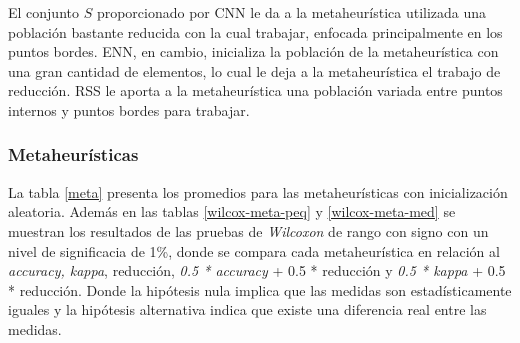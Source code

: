 El conjunto $S$ proporcionado por CNN le da a la metaheurística utilizada una población bastante reducida con la cual trabajar, enfocada principalmente en los puntos bordes. ENN, en cambio, inicializa la población de la metaheurística con una gran cantidad de elementos, lo cual le deja a la metaheurística el trabajo de reducción. RSS le aporta a la metaheurística una población variada entre puntos internos y puntos bordes para trabajar.

\subsubsection{Metaheurísticas}


La tabla \ref{meta} presenta los promedios para las metaheurísticas con inicialización aleatoria. Además en las tablas \ref{wilcox-meta-peq} y \ref{wilcox-meta-med} se muestran los resultados de las pruebas de \emph{Wilcoxon} de rango con signo con un nivel de significacia de 1\%, donde se compara cada metaheurística en relación al \emph{accuracy, kappa}, reducción, \emph{0.5 * accuracy} + 0.5 * reducción y \emph{0.5 * kappa} + 0.5 * reducción. Donde la hipótesis nula implica que las medidas son estadísticamente iguales y la hipótesis alternativa indica que existe una diferencia real entre las medidas. 

